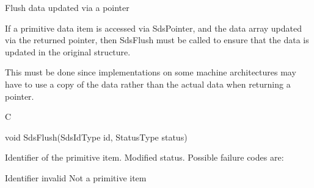 \begin{manroutinedescription}
      Flush data updated via a pointer

      If a primitive data item is accessed via SdsPointer, and the data
      array updated via the returned pointer, then SdsFlush must be called
      to ensure that the data is updated in the original structure.

      This must be done since implementations on some machine architectures
      may have to use a copy of the data rather than the actual data when
      returning a pointer.
 
      C

      void SdsFlush(SdsIdType id, StatusType {\mantt{*}} {} %
status)
 
\begin{manparametertable}
  Identifier of the primitive %
item.
 Modified status. Possible %
failure codes are:
\end{manparametertable}
\begin{mantwocolumntable}
Identifier invalid
Not a primitive item
\end{mantwocolumntable}
\end{manroutinedescription}
